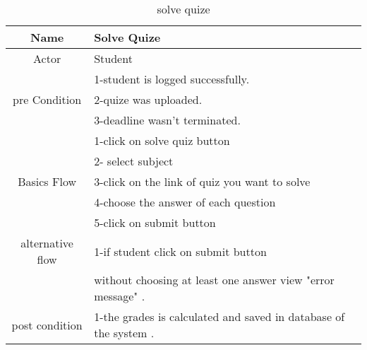 \documentclass{article}
\begin{document}
	
    
    \begin{table}[!h]
    	\centering
    	\caption{solve quize}
    	\label{solve quize}
    	
    	\begin{tabular}{|c|l|}
    		\hline
    		Name & Solve Quize \\
    		\hline
    		Actor & Student \\ 
    		\hline
    		              &1-student is logged successfully.\\
    		pre Condition &2-quize was uploaded.\\
         		          &3-deadline wasn't terminated.\\
         \hline
                           &1-click on solve quiz button\\  
                           &2- select subject\\
       Basics Flow   &3-click on the link of quiz you want to solve \\
                           &4-choose the answer of each question\\
                           &5-click on submit button\\
         \hline 
          alternative flow & 1-if student click on submit button\\& without choosing at least one answer view "error message" .\\
          \hline
                
          post condition & 1-the grades is calculated and saved in database of the system .\\
          \hline
                        
    		
    	\end{tabular}
    	
    \end{table}
    
\end{document}
